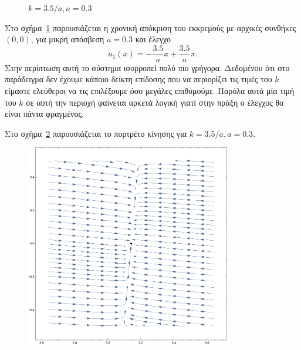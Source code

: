 \begin{solution}
\begin{figure}[h!]
{{        \( k = 3.5/a, a = 0.3 \)}}
        \label{fig:ex10_invPend35a}
    \end{figure}
    Στο σχήμα~\ref{fig:ex10_invPend35a} παρουσιάζεται η χρονική απόκριση του
    εκκρεμούς με αρχικές συνθήκες \( (0, 0) \), για μικρή απόσβεση \( a = 0.3 \) και έλεγχο
    \[
        u_1(x) = -\frac{3.5}{a}x + \frac{3.5}{a}\pi.
    \]
    Στην περίπτωση αυτή το σύστημα ισορροπεί πολύ πιο γρήγορα. Δεδομένου ότι στο
    παράδειγμα δεν έχουμε κάποιο δείκτη επίδοσης που να περιορίζει τις τιμές του
    \( k \) είμαστε ελεύθεροι να τις επιλέξουμε όσο μεγάλες επιθυμούμε. Παρόλα
    αυτά μία τιμή του \( k \) σε αυτή την περιοχή φαίνεται αρκετά λογική γιατί
    στην πράξη ο έλεγχος θα είναι πάντα φραγμένος.

    Στο σχήμα~\ref{fig:ex10_invPend35aComb} παρουσιάζεται το πορτρέτο κίνησης
    για \( k = 3.5/a, a = 0.3 \).
    \begin{figure}[h]
        \centering
        \includegraphics[width=0.8\textwidth]{figures/ex10_invPend35aComb.pdf}
        \caption{}
        \label{fig:ex10_invPend35aComb}
    \end{figure}


\end{solution}
